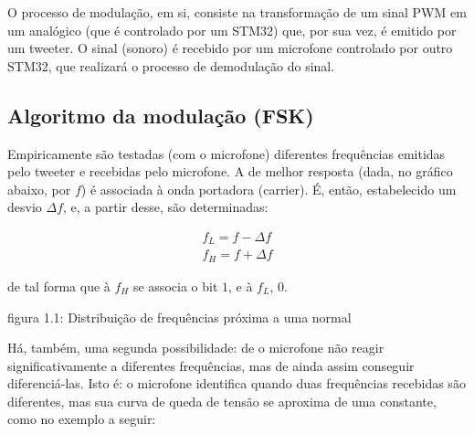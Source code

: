 \documentclass[11pt,a4paper]{report}
\begin{document}
	
	O processo de modulação, em si, consiste na transformação de um sinal PWM em um analógico (que é controlado por um STM32) que, por sua vez, é emitido por um tweeter. O sinal (sonoro) é recebido por um microfone controlado por outro STM32, que realizará o processo de demodulação do sinal.
	\subsection{Algoritmo da modulação (FSK)}	

	Empiricamente são testadas (com o microfone) diferentes frequências emitidas pelo tweeter e recebidas pelo microfone. A de melhor resposta (dada, no gráfico abaixo, por $f$) é associada à onda portadora (carrier). É, então, estabelecido um desvio $\Delta{f}$, e, a partir desse, são determinadas:
	\begin{center}
		\begin{align*}
		f_L = f - \Delta{f}\\
		f_H = f + \Delta{f}
		\end{align*}
	\end{center}
	de tal forma que à $f_H$ se associa o bit $1$, e à $f_L$, $0$.
	

	
	\begin{center}
	\end{center}
\begin{center}
	{\footnotesize figura 1.1: Distribuição de frequências próxima a uma normal}
\end{center}

Há, também, uma segunda possibilidade: de o microfone não reagir significativamente a diferentes frequências, mas de ainda assim conseguir diferenciá-las. Isto é: o microfone identifica quando duas frequências recebidas são diferentes, mas sua curva de queda de tensão se aproxima de uma constante, como no exemplo a seguir:
\end{document}
